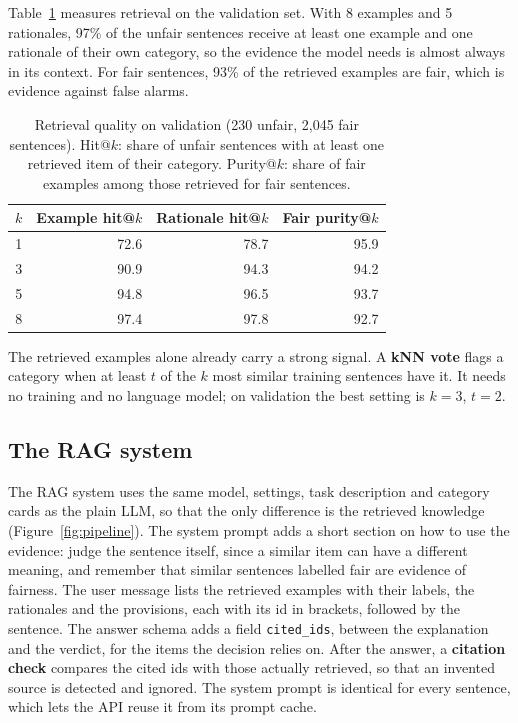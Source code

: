 Table~\ref{tab:retrieval} measures retrieval on the validation set. With 8 examples and 5 rationales, 97\% of the unfair sentences receive at least one example and one rationale of their own category, so the evidence the model needs is almost always in its context. For fair sentences, 93\% of the retrieved examples are fair, which is evidence against false alarms.

\begin{table}[ht]
\centering\small
\caption{Retrieval quality on validation (230 unfair, 2,045 fair sentences). Hit@$k$: share of unfair sentences with at least one retrieved item of their category. Purity@$k$: share of fair examples among those retrieved for fair sentences.}
\label{tab:retrieval}
\begin{tabular}{@{}rrrr@{}}
\toprule
$k$ & Example hit@$k$ & Rationale hit@$k$ & Fair purity@$k$ \\
\midrule
1 & 72.6 & 78.7 & 95.9 \\
3 & 90.9 & 94.3 & 94.2 \\
5 & 94.8 & 96.5 & 93.7 \\
8 & 97.4 & 97.8 & 92.7 \\
\bottomrule
\end{tabular}
\end{table}

The retrieved examples alone already carry a strong signal. A \textbf{kNN vote} flags a category when at least $t$ of the $k$ most similar training sentences have it. It needs no training and no language model; on validation the best setting is $k=3$, $t=2$.

\subsection{The RAG system}
\label{sec:rag}

The RAG system uses the same model, settings, task description and category cards as the plain LLM, so that the only difference is the retrieved knowledge (Figure~\ref{fig:pipeline}). The system prompt adds a short section on how to use the evidence: judge the sentence itself, since a similar item can have a different meaning, and remember that similar sentences labelled fair are evidence of fairness. The user message lists the retrieved examples with their labels, the rationales and the provisions, each with its id in brackets, followed by the sentence. The answer schema adds a field \texttt{cited\_ids}, between the explanation and the verdict, for the items the decision relies on. After the answer, a \textbf{citation check} compares the cited ids with those actually retrieved, so that an invented source is detected and ignored. The system prompt is identical for every sentence, which lets the API reuse it from its prompt cache.

